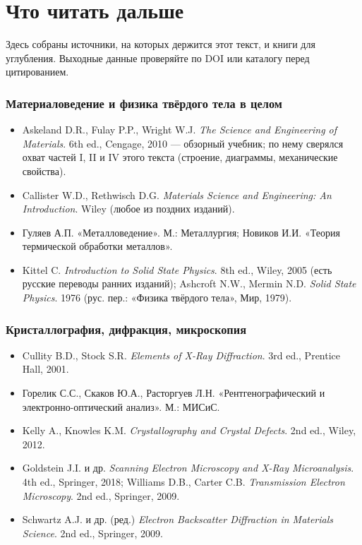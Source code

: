 \chapter{Что читать дальше}
\sloppy

Здесь собраны источники, на которых держится этот текст, и книги для углубления. Выходные данные проверяйте по
DOI или каталогу перед цитированием.

\subsection*{Материаловедение и физика твёрдого тела в целом}
\begin{itemize}
\item Askeland D.R., Fulay P.P., Wright W.J. \emph{The Science and Engineering of Materials}. 6th ed., Cengage, 2010 ---
  обзорный учебник; по нему сверялся охват частей I, II и IV этого текста (строение, диаграммы, механические свойства).
\item Callister W.D., Rethwisch D.G. \emph{Materials Science and Engineering: An Introduction}. Wiley (любое из поздних изданий).
\item Гуляев А.П. «Металловедение». М.: Металлургия; Новиков И.И. «Теория термической обработки металлов».
\item Kittel C. \emph{Introduction to Solid State Physics}. 8th ed., Wiley, 2005 (есть русские переводы ранних изданий);
  Ashcroft N.W., Mermin N.D. \emph{Solid State Physics}. 1976 (рус. пер.: «Физика твёрдого тела», Мир, 1979).
\end{itemize}

\subsection*{Кристаллография, дифракция, микроскопия}
\begin{itemize}
\item Cullity B.D., Stock S.R. \emph{Elements of X-Ray Diffraction}. 3rd ed., Prentice Hall, 2001.
\item Горелик С.С., Скаков Ю.А., Расторгуев Л.Н. «Рентгенографический и электронно-оптический анализ». М.: МИСиС.
\item Kelly A., Knowles K.M. \emph{Crystallography and Crystal Defects}. 2nd ed., Wiley, 2012.
\item Goldstein J.I. и др. \emph{Scanning Electron Microscopy and X-Ray Microanalysis}. 4th ed., Springer, 2018;
  Williams D.B., Carter C.B. \emph{Transmission Electron Microscopy}. 2nd ed., Springer, 2009.
\item Schwartz A.J. и др. (ред.) \emph{Electron Backscatter Diffraction in Materials Science}. 2nd ed., Springer, 2009.
\end{itemize}

